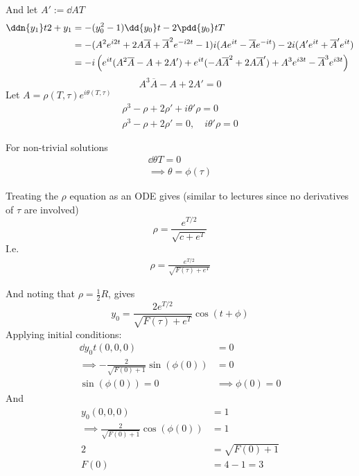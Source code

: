 \documentclass{X:/Documents/Coding/Latex/myassignment}
\begin{document}
\begin{enumerate}
\begin{enumerate}
		And let $A' := \dd{A}{T}$
		\begin{align*}
			\ddn{y_1}t2 + y_1 &= -(y_0^2-1)\dd{y_0}t - 2\pdd{y_0}tT\\
			&=-(A^2e^{i2t} + 2A\overline{A} + \overline{A}^2 e^{-i2t} -1)i(Ae^{it} - \overline{A}e^{-it}) - 2i(A'e^{it} + \overline{A}'e^{it})\\
			&=-i\left(e^{it}(A^2\overline{A} - A + 2A') +e^{it}(-A\overline{A}^2 + 2A\overline{A}') + A^3e^{i3t} - \overline{A}^3e^{i3t}\right)
		\end{align*}
		\[A^3\overline{A} - A + 2A' = 0\]
		Let $A = \rho(T,\tau)e^{i\theta(T,\tau)}$
		\begin{align*}
			\rho^3 - \rho + 2\rho' + i\theta' \rho =0\\
			\rho^3 - \rho + 2\rho' = 0, \quad i\theta' \rho = 0
		\end{align*}

		For non-trivial solutions
		\begin{align*}
			\dd\theta T = 0\\
			\implies \theta = \phi(\tau)
		\end{align*}

		Treating the $\rho$ equation as an ODE gives  (similar to lectures since no derivatives of $\tau$ are involved)
		\[\rho = \frac{e^{T/2}}{\sqrt{c + e^{T}}}\]
		I.e.
		\begin{align*}
			\rho = \frac{e^{T/2}}{\sqrt{F(\tau) + e^{T}}}
		\end{align*}

		And noting that $\rho = \frac12 R$, gives
		\[y_0 = \frac{2e^{T/2}}{\sqrt{F(\tau) + e^{T}}}\cos(t+\phi)\]
		Applying initial conditions:
		\begin{align*}
			\dd{y_0}{t}(0,0,0) &= 0 \\
			\implies -\frac{2}{\sqrt{F(0) + 1}}\sin(\phi(0)) &=0\\
			\sin(\phi(0)) = 0 &\implies \phi(0) = 0
		\end{align*}
		And
		\begin{align*}
			y_0(0,0,0) &= 1\\
			\implies  \frac{2}{\sqrt{F(0) + 1}}\cos(\phi(0)) &= 1\\
			2 &= \sqrt{F(0) + 1}\\
			F(0) &= 4-1 = 3
		\end{align*}




\end{enumerate}
\end{enumerate}
\end{document}
